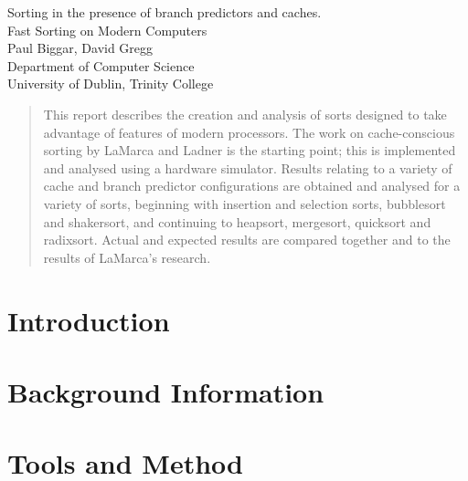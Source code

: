 \documentclass{report}
\begin{document}
\begin{titlepage}
        \begin{center}
                \vspace*{95mm}
                \LARGE Sorting in the presence of branch predictors and caches.\\
				\vspace{1em}
                \large Fast Sorting on Modern Computers\\
                \vspace{1em}
                \large Paul Biggar, David Gregg\\
                \large Department of Computer Science\\
				\large University of Dublin, Trinity College
        \end{center}
\end{titlepage}


\begin{abstract}
This report describes the creation and analysis of sorts designed to take
advantage of features of modern processors. The work on cache-conscious sorting
by LaMarca and Ladner is the starting point; this is implemented and analysed
using a hardware simulator. Results relating to a variety of cache and branch
predictor configurations are obtained and analysed for a variety of sorts,
beginning with insertion and selection sorts, bubblesort and shakersort, and
continuing to heapsort, mergesort, quicksort and radixsort. Actual and expected
results are compared together and to the results of LaMarca's research.
\end{abstract}

\tableofcontents
\listoffigures

\setlength{\parskip}{1em}
\setlength{\parindent}{0ex}

\chapter{Introduction}



\chapter{Background Information}



\chapter{Tools and Method}
\end{document}
